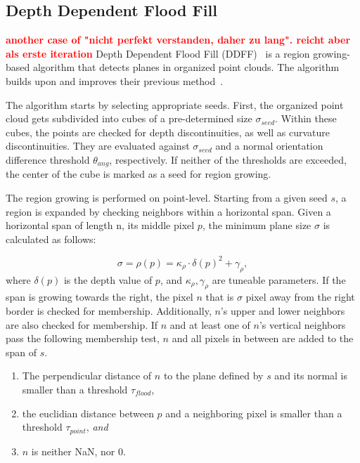 \documentclass[main.tex]{subfiles}
\begin{document}
\subsection{Depth Dependent Flood Fill}
\textbf{\textcolor{red}{another case of "nicht perfekt verstanden, daher zu lang". reicht aber als erste iteration}}
Depth Dependent Flood Fill (DDFF)~\cite{Roychoudhury_Missura_Bennewitz_2021_new} is a region growing-based algorithm that detects planes in organized point clouds.
The algorithm builds upon and improves their previous method~\cite{Roychoudhury_Missura_Bennewitz_2021_old}.

The algorithm starts by selecting appropriate seeds. First, the organized point cloud gets subdivided into cubes of a
pre-determined size $\sigma_{seed}$. Within these cubes, the points are checked for depth discontinuities, as well as 
curvature discontinuities. They are evaluated against $\sigma_{seed}$ and a normal orientation difference 
threshold $\theta_{ang}$, respectively. If neither of the thresholds are exceeded, the center of the cube is marked as 
a seed for region growing. 

The region growing is performed on point-level. Starting from a given seed $s$, a region is expanded by checking 
neighbors within a horizontal span. 
Given a horizontal span of length n, its middle pixel $p$, the minimum plane size $\sigma$ is calculated as follows:

\begin{equation}
    \sigma = \rho(p) = \kappa_\rho \cdot \delta(p)^2 + \gamma_\rho,
\end{equation}
where $\delta(p)$ is the depth value of $p$, and $\kappa_\rho, \gamma_\rho$ are tuneable parameters.
If the span is growing towards the right, the pixel $n$ that is $\sigma$ pixel away from the right border is checked 
for membership. Additionally, $n$'s upper and lower neighbors are also checked for membership. If $n$ and at least one
of $n$'s vertical neighbors pass the following membership test, $n$ and all pixels in between are added to the span of $s$.

\begin{enumerate}
    \item The perpendicular distance of $n$ to the plane defined by $s$ and its normal is smaller than 
    a threshold $\tau_{flood}$,
    \item the euclidian distance between $p$ and a neighboring pixel is smaller than a threshold 
    $\tau_{point}$, \textit{and}
    \item $n$ is neither NaN, nor 0. 
\end{enumerate}
\end{document}
